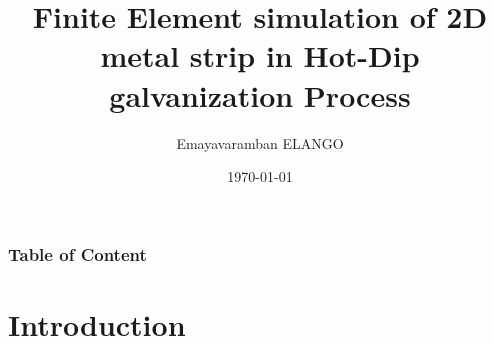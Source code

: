 \documentclass[9pt]{beamer}
\title{Finite Element simulation of 2D metal strip in Hot-Dip galvanization Process}
\author{Emayavaramban ELANGO}
\institute{\'Ecole centrale De Nantes}
\date{\today}
\begin{document}



\frame{\titlepage}

\begin{frame}
\frametitle{Table of Content}
\tableofcontents
\end{frame}
\section{Introduction}
\end{document}
